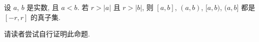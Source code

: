 \begin{proposition}
    设 $a$, $b$ 是实数, 且 $a < b$. 若 $r > |a|$ 且 $r > |b|$, 则 $[a,b]$, $(a,b)$, $[a,b)$, $(a,b]$ 都是 $[-r, r]$ 的真子集.
\end{proposition}

\begin{pf}
    请读者尝试自行证明此命题.
\end{pf}









